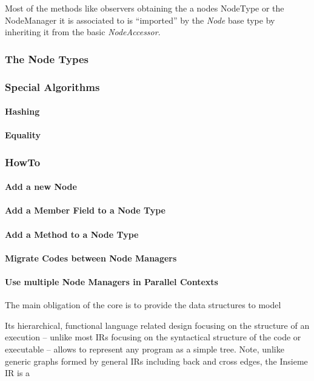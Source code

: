 Most of the
methods like observers obtaining the a nodes NodeType or the
NodeManager it is associated to is ``imported'' by the \textit{Node} base type
by inheriting it from the basic \textit{NodeAccessor}. 


\subsubsection{The Node Types}

\subsubsection{Special Algorithms}
\paragraph{Hashing}
\paragraph{Equality}

\subsubsection{HowTo}
\paragraph{Add a new Node}
\paragraph{Add a Member Field to a Node Type}
\paragraph{Add a Method to a Node Type}
\paragraph{Migrate Codes between Node Managers}
\paragraph{Use multiple Node Managers in Parallel Contexts}


The main obligation of the core is to provide the data structures to model 


Its hierarchical, functional
language related design focusing on the structure of an execution -- unlike
most IRs focusing on the syntactical structure of the code or executable --
allows to represent any program as a simple tree. Note, unlike generic graphs
formed by general IRs including back and cross edges, the Insieme IR is a 

